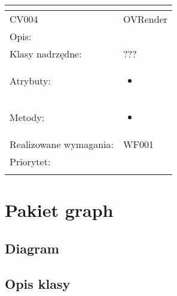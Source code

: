 \documentclass[a4paper,10pt]{article}
\begin{document}
\begin{center}
\begin{tabular}{|m{3cm}|m{9cm}|}
\multicolumn{2}{c}{} \\
 \hline

CV004 & OVRender \\ \hline
Opis: &     \\ \hline
Klasy nadrzędne: &  ???   \\ \hline
Atrybuty: & \begin{itemize}
 \item 
\end{itemize}
 \\ \hline
Metody: & \begin{itemize}
 \item 
\end{itemize}
  \\ \hline
Realizowane wymagania: & WF001 \\ \hline
Priorytet: &  \\ \hline

\multicolumn{2}{c}{} \\
 \hline


\end{tabular}

\end{center}

\section{Pakiet graph}

\subsection{Diagram}

\subsection{Opis klasy}
\end{document}
